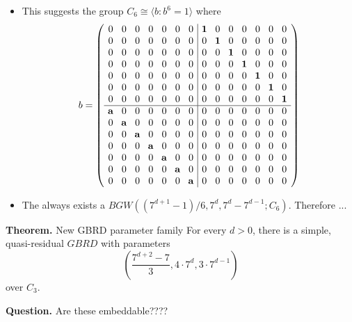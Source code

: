 \documentclass{beamer}
\begin{document}
\begin{frame}

  \begin{itemize}
  \item This suggests the group $C_6 \cong \langle b : b^6=1 \rangle$ where
    \[
      b =
      \left(
        \arraycolsep=4.0pt\def\arraystretch{1.0}
        \begin{array}{ccccccc|ccccccc}
          0&0&0&0&0&0&0&\mathbf{1}&0&0&0&0&0&0\\
          0&0&0&0&0&0&0&0&\mathbf{1}&0&0&0&0&0\\
          0&0&0&0&0&0&0&0&0&\mathbf{1}&0&0&0&0\\
          0&0&0&0&0&0&0&0&0&0&\mathbf{1}&0&0&0\\
          0&0&0&0&0&0&0&0&0&0&0&\mathbf{1}&0&0\\
          0&0&0&0&0&0&0&0&0&0&0&0&\mathbf{1}&0\\
          0&0&0&0&0&0&0&0&0&0&0&0&0&\mathbf{1}\\ \hline
          \mathbf{a}&0&0&0&0&0&0&0&0&0&0&0&0&0\\
          0&\mathbf{a}&0&0&0&0&0&0&0&0&0&0&0&0\\
          0&0&\mathbf{a}&0&0&0&0&0&0&0&0&0&0&0\\
          0&0&0&\mathbf{a}&0&0&0&0&0&0&0&0&0&0\\
          0&0&0&0&\mathbf{a}&0&0&0&0&0&0&0&0&0\\
          0&0&0&0&0&\mathbf{a}&0&0&0&0&0&0&0&0\\
          0&0&0&0&0&0&\mathbf{a}&0&0&0&0&0&0&0\\
        \end{array}
      \right)
    \]
  \end{itemize}

\end{frame}

\begin{frame}

  \begin{itemize}
  \item The always exists a $BGW((7^{d+1}-1)/6,7^d,7^d-7^{d-1}; C_6)$.
    Therefore ...
  \end{itemize}

  \begin{block}{{\bf Theorem.} New GBRD parameter family}
    For every $d>0$, there is a simple, quasi-residual $GBRD$ with parameters
    \[
      \left(
        \frac{7^{d+2}-7}{3}, 4 \cdot 7^d, 3 \cdot 7^{d-1}
      \right)
    \]
    over $C_3$.
  \end{block}

  \begin{exampleblock} {{\bf Question.}}
    Are these embeddable????
  \end{exampleblock}

\end{frame}
\end{document}
